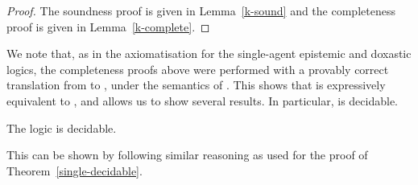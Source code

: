 \begin{proof}
The soundness proof is given in Lemma~\ref{k-sound} and the completeness
proof is given in Lemma~\ref{k-complete}.
\end{proof}

We note that, as in the axiomatisation for the single-agent epistemic and
doxastic logics, the completeness proofs above were performed with a provably
correct translation from \langF{} to \lang{}, under the semantics of
\logicKF{}. This shows that \logicKF{} is expressively equivalent to
\logicK{}, and allows us to show several results. In particular, \logicKF{} is
decidable.

\begin{theorem}
The logic \logicKF{} is decidable.
\end{theorem}

This can be shown by following similar reasoning as used for the proof of
Theorem~\ref{single-decidable}.
